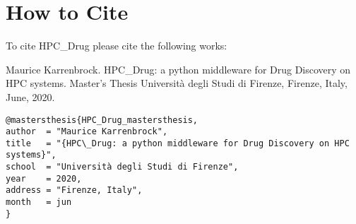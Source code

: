 
\chapter{How to Cite}

To cite HPC\_Drug please cite the following works:

Maurice Karrenbrock. HPC\_Drug: a python middleware for Drug Discovery on HPC systems. Master's Thesis Università degli Studi di Firenze, Firenze, Italy, June, 2020.\cite{HPC_Drug_mastersthesis}
\begin{verbatim}
@mastersthesis{HPC_Drug_mastersthesis,
author  = "Maurice Karrenbrock",
title   = "{HPC\_Drug: a python middleware for Drug Discovery on HPC systems}",
school  = "Università degli Studi di Firenze",
year    = 2020,
address = "Firenze, Italy",
month   = jun
}
\end{verbatim}
